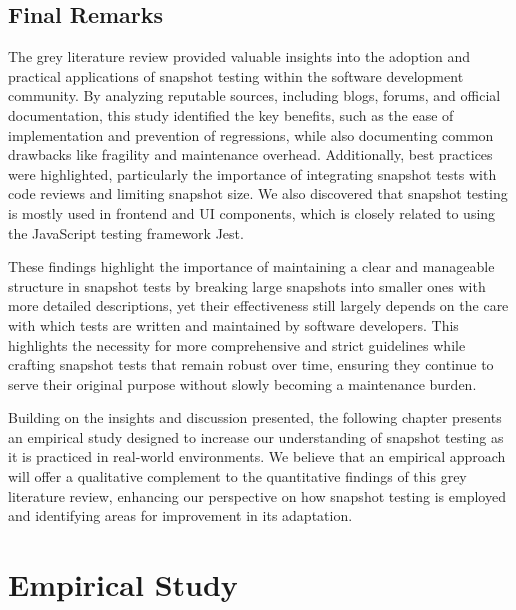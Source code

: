 \documentclass[
	msc, %
	english %
]{../ppgccufmg}
\begin{document}
        \section{Final Remarks}\label{sec:ch3-final-remarks}
        
        The grey literature review provided valuable insights into the adoption and practical applications of snapshot testing within the software development community. By analyzing reputable sources, including blogs, forums, and official documentation, this study identified the key benefits, such as the ease of implementation and prevention of regressions, while also documenting common drawbacks like fragility and maintenance overhead. Additionally, best practices were highlighted, particularly the importance of integrating snapshot tests with code reviews and limiting snapshot size. We also discovered that snapshot testing is mostly used in frontend and UI components, which is closely related to using the JavaScript testing framework Jest.

        These findings highlight the importance of maintaining a clear and manageable structure in snapshot tests by breaking large snapshots into smaller ones with more detailed descriptions, yet their effectiveness still largely depends on the care with which tests are written and maintained by software developers. This highlights the necessity for more comprehensive and strict guidelines while crafting snapshot tests that remain robust over time, ensuring they continue to serve their original purpose without slowly becoming a maintenance burden.

        Building on the insights and discussion presented, the following chapter presents an empirical study designed to increase our understanding of snapshot testing as it is practiced in real-world environments. We believe that an empirical approach will offer a qualitative complement to the quantitative findings of this grey literature review, enhancing our perspective on how snapshot testing is employed and identifying areas for improvement in its adaptation.
        
     \chapter{Empirical Study}
     
\end{document}
